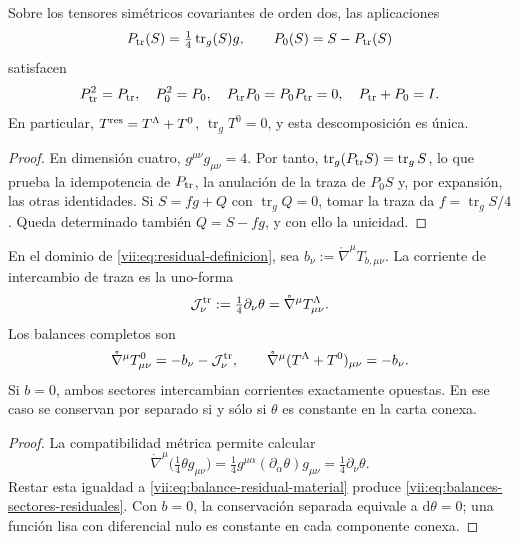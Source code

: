 \begin{proposition}
\label{vii:prop:proyectores-traza-residual}
Sobre los tensores simétricos covariantes de orden dos, las aplicaciones
\[
 P_{\rm tr}(S)=\tfrac14\operatorname{tr}_g(S)g,
 \qquad P_0(S)=S-P_{\rm tr}(S)
\]
satisfacen
\begin{equation}
 P_{\rm tr}^2=P_{\rm tr},\quad P_0^2=P_0,\quad
 P_{\rm tr}P_0=P_0P_{\rm tr}=0,\quad P_{\rm tr}+P_0=I.
 \label{vii:eq:proyectores-traza-residual}
\end{equation}
En particular, \(T^{\rm res}=T^\Lambda+T^0\),
\(\operatorname{tr}_gT^0=0\), y esta descomposición es única.
\end{proposition}
\begin{proof}
En dimensión cuatro, \(g^{\mu\nu}g_{\mu\nu}=4\). Por tanto,
\(\operatorname{tr}_g(P_{\rm tr}S)=\operatorname{tr}_gS\), lo que
prueba la idempotencia de \(P_{\rm tr}\), la anulación de la traza
de \(P_0S\) y, por expansión, las otras identidades.
Si \(S=fg+Q\) con \(\operatorname{tr}_gQ=0\), tomar la traza
da \(f=\operatorname{tr}_gS/4\). Queda determinado también
\(Q=S-fg\), y con ello la unicidad.
\end{proof}

\begin{theorem}
\label{vii:thm:intercambio-traza-residual}
En el dominio de \eqref{vii:eq:residual-definicion}, sea
\(b_\nu:=\mathring\nabla^\mu T_{b,\mu\nu}\). La corriente
de intercambio de traza es la uno-forma
\begin{equation}
 \mathcal J^{\rm tr}_\nu
 :=\tfrac14\partial_\nu\theta
 =\mathring\nabla^\mu T^\Lambda_{\mu\nu}.
 \label{vii:eq:corriente-intercambio-traza}
\end{equation}
Los balances completos son
\begin{equation}
 \mathring\nabla^\mu T^0_{\mu\nu}
       =-b_\nu-\mathcal J^{\rm tr}_\nu,
 \qquad
 \mathring\nabla^\mu(T^\Lambda+T^0)_{\mu\nu}=-b_\nu.
 \label{vii:eq:balances-sectores-residuales}
\end{equation}
Si \(b=0\), ambos sectores intercambian corrientes exactamente opuestas.
En ese caso se conservan por separado si y sólo si \(\theta\) es
constante en la carta conexa.
\end{theorem}
\begin{proof}
La compatibilidad métrica permite calcular
\[
 \mathring\nabla^\mu\bigl(\tfrac14\theta g_{\mu\nu}\bigr)
 =\tfrac14g^{\mu\alpha}(\partial_\alpha\theta)g_{\mu\nu}
 =\tfrac14\partial_\nu\theta.
\]
Restar esta igualdad a \eqref{vii:eq:balance-residual-material} produce
\eqref{vii:eq:balances-sectores-residuales}. Con \(b=0\), la
conservación separada equivale a \(\mathrm d\theta=0\); una función
lisa con diferencial nulo es constante en cada componente conexa.
\end{proof}

